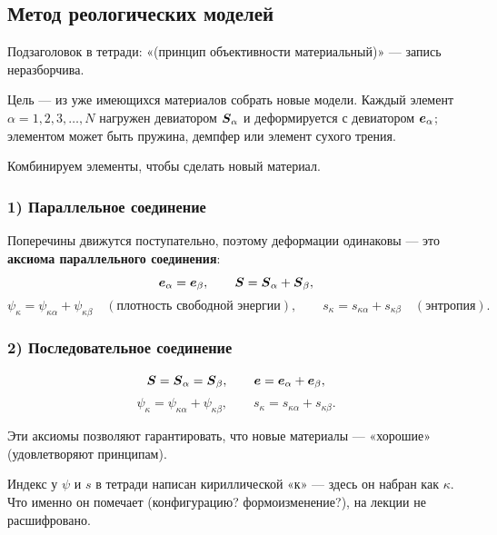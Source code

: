 \subsection{Метод реологических моделей}

\begin{warn}
Подзаголовок в тетради: «(принцип объективности материальный)» — запись
неразборчива.
\end{warn}

Цель — из уже имеющихся материалов собрать новые модели. Каждый элемент
$\alpha = 1, 2, 3, \dots, N$ нагружен девиатором $\boldsymbol{S}_\alpha$ и деформируется
с девиатором $\boldsymbol{e}_\alpha$; элементом может быть пружина, демпфер или элемент
сухого трения.


Комбинируем элементы, чтобы сделать новый материал.

\subsubsection*{1) Параллельное соединение}


Поперечины движутся поступательно, поэтому деформации одинаковы —
это \textbf{аксиома параллельного соединения}:
\[
  \boldsymbol{e}_\alpha = \boldsymbol{e}_\beta ,
  \qquad
  \boldsymbol{S} = \boldsymbol{S}_\alpha + \boldsymbol{S}_\beta ,
\]
\[
  \psi_\kappa = \psi_{\kappa\alpha} + \psi_{\kappa\beta}
  \quad(\text{плотность свободной энергии}),
  \qquad
  s_\kappa = s_{\kappa\alpha} + s_{\kappa\beta}
  \quad(\text{энтропия}).
\]

\subsubsection*{2) Последовательное соединение}

\[
  \boldsymbol{S} = \boldsymbol{S}_\alpha = \boldsymbol{S}_\beta ,
  \qquad
  \boldsymbol{e} = \boldsymbol{e}_\alpha + \boldsymbol{e}_\beta ,
\]
\[
  \psi_\kappa = \psi_{\kappa\alpha} + \psi_{\kappa\beta} ,
  \qquad
  s_\kappa = s_{\kappa\alpha} + s_{\kappa\beta} .
\]

Эти аксиомы позволяют гарантировать, что новые материалы — «хорошие»
(удовлетворяют принципам).

\begin{warn}
Индекс у $\psi$ и $s$ в тетради написан кириллической «к» — здесь он набран как
$\kappa$. Что именно он помечает (конфигурацию? формоизменение?), на лекции не
расшифровано.
\end{warn}


